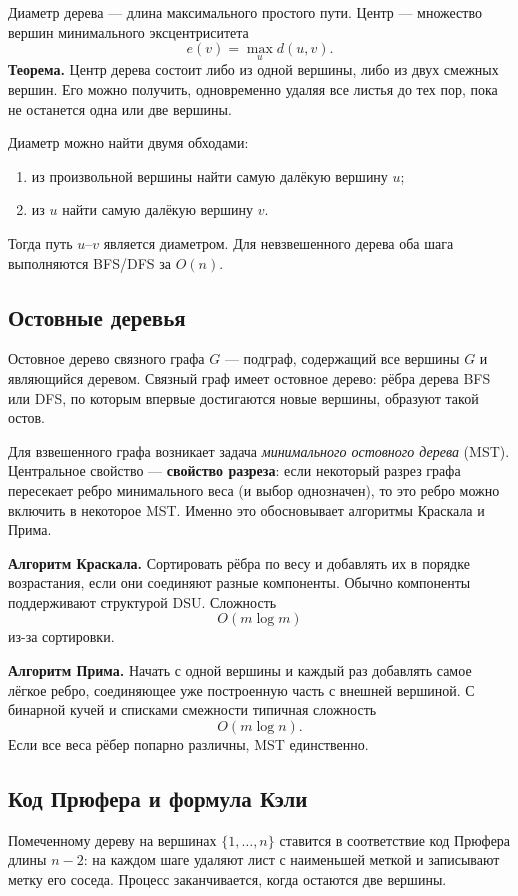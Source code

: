 Диаметр дерева --- длина максимального простого пути. Центр --- множество вершин
минимального эксцентриситета
\[
 e(v)=\max_u d(u,v).
\]
\textbf{Теорема.} Центр дерева состоит либо из одной вершины, либо из двух
смежных вершин. Его можно получить, одновременно удаляя все листья до тех пор,
пока не останется одна или две вершины.

Диаметр можно найти двумя обходами:
\begin{enumerate}
 \item из произвольной вершины найти самую далёкую вершину $u$;
 \item из $u$ найти самую далёкую вершину $v$.
\end{enumerate}
Тогда путь $u$--$v$ является диаметром. Для невзвешенного дерева оба шага
выполняются BFS/DFS за $O(n)$.

\subsection{Остовные деревья}

Остовное дерево связного графа $G$ --- подграф, содержащий все вершины $G$ и
являющийся деревом. Связный граф имеет остовное дерево: рёбра дерева BFS или DFS,
по которым впервые достигаются новые вершины, образуют такой остов.

Для взвешенного графа возникает задача \emph{минимального остовного дерева}
(MST). Центральное свойство --- \textbf{свойство разреза}: если некоторый разрез
графа пересекает ребро минимального веса (и выбор однозначен), то это ребро можно
включить в некоторое MST. Именно это обосновывает алгоритмы Краскала и Прима.

\textbf{Алгоритм Краскала.} Сортировать рёбра по весу и добавлять их в порядке
возрастания, если они соединяют разные компоненты. Обычно компоненты поддерживают
структурой DSU. Сложность
\[
    O(m\log m)
\]
из-за сортировки.

\textbf{Алгоритм Прима.} Начать с одной вершины и каждый раз добавлять самое
лёгкое ребро, соединяющее уже построенную часть с внешней вершиной. С бинарной
кучей и списками смежности типичная сложность
\[
    O(m\log n).
\]
Если все веса рёбер попарно различны, MST единственно.

\subsection{Код Прюфера и формула Кэли}

Помеченному дереву на вершинах $\{1,\ldots,n\}$ ставится в соответствие код
Прюфера длины $n-2$: на каждом шаге удаляют лист с наименьшей меткой и записывают
метку его соседа. Процесс заканчивается, когда остаются две вершины.

